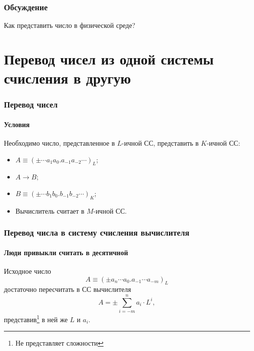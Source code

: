 \begin{frame}
    \frametitle{Обсуждение}
    
    Как представить число в физической среде?
\end{frame}


\section{Перевод чисел из одной системы счисления в другую}

\begin{frame}
    \frametitle{Перевод чисел}
    \framesubtitle{Условия}
    
    Необходимо число, представленное в $L$-ичной СС, представить в $K$-ичной СС:
    \begin{itemize}
        \item $A\equiv(\pm\cdots a_1a_0.a_{-1}a_{-2}\cdots)_L$;
        \item $A\to B$;
        \item $B\equiv(\pm\cdots b_1b_0.b_{-1}b_{-2}\cdots)_K$;
        \item Вычислитель считает в $M$-ичной СС.
    \end{itemize}
\end{frame}

\begin{frame}
    \frametitle{Перевод числа в систему счисления вычислителя}
    \framesubtitle{Люди привыкли считать в десятичной}
    
    Исходное число
    \[
        A\equiv(\pm a_{n}\cdots a_{0}.a_{-1}\cdots a_{-m})_L
    \]
    достаточно пересчитать в СС вычислителя
    \[
        A=\pm\sum_{i=-m}^{n}a_i\cdot L^{i},
    \]
    представив\footnote{Не представляет сложности} в ней же $L$ и $a_i$.
\end{frame}

